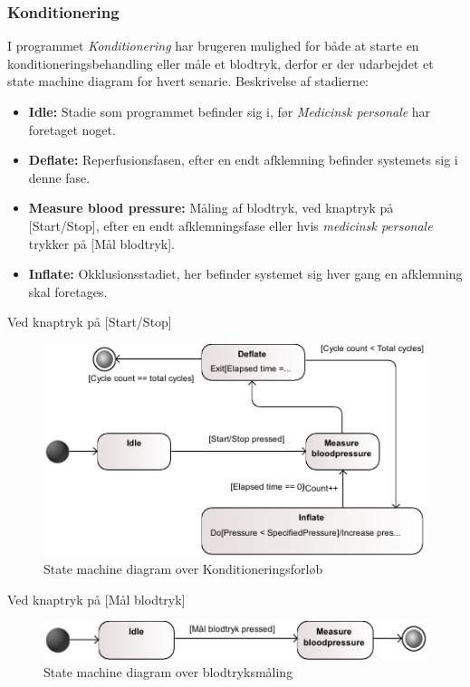 \subsubsection{Konditionering}
I programmet \textit{Konditionering} har brugeren mulighed for både at starte en konditioneringsbehandling eller måle et blodtryk, derfor er der udarbejdet et state machine diagram for hvert senarie. Beskrivelse af stadierne:
\begin{itemize}
	\item \textbf{Idle:} Stadie som programmet befinder sig i, før \textit{Medicinsk personale} har foretaget noget.
	\item \textbf{Deflate:} Reperfusionsfasen, efter en endt afklemning befinder systemets sig i denne fase.
	\item \textbf{Measure blood pressure:} Måling af blodtryk, ved knaptryk på [Start/Stop], efter en endt afklemningsfase eller hvis \textit{medicinsk personale} trykker på [Mål blodtryk].
	\item \textbf{Inflate:} Okklusionsstadiet, her befinder systemet sig hver gang en afklemning skal foretages.
\end{itemize}
Ved knaptryk på [Start/Stop] \\
\begin{figure}[H]
\includegraphics[width=\textwidth]{pdfs/STM_Konditionering1-crop.pdf}
\caption{State machine diagram over Konditioneringsforløb}
\end{figure}

Ved knaptryk på [Mål blodtryk] \\
\begin{figure}[H]
\includegraphics[width=\textwidth]{pdfs/STM_Konditionering2-crop.pdf}
\caption{State machine diagram over blodtryksmåling}
\end{figure}
\newpage

